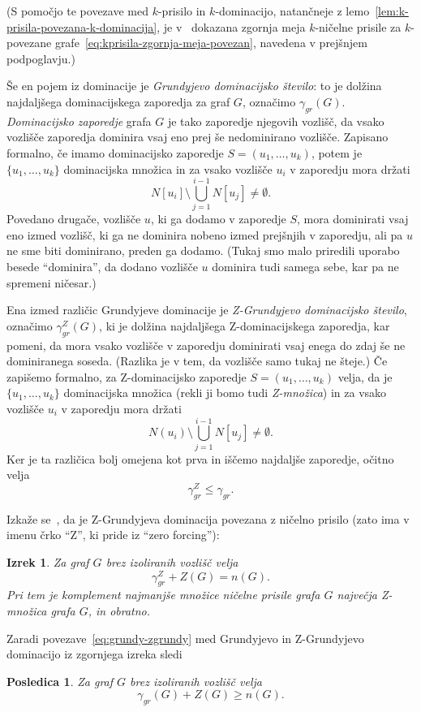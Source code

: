 \documentclass[12pt,a4paper,twoside]{article}
\theoremstyle{definition} %
\theoremstyle{plain} %
\newtheorem{izrek}[definicija]{Izrek}
\newtheorem{posledica}[definicija]{Posledica}
\numberwithin{equation}{section}  %
\begin{document}
(S pomočjo te povezave med $k$-prisilo in $k$-dominacijo, natančneje z lemo~\ref{lem:k-prisila-povezana-k-dominacija}, je v~\cite{amos2015kforcing} dokazana zgornja meja $k$-ničelne prisile za $k$-povezane grafe~\eqref{eq:kprisila-zgornja-meja-povezan}, navedena v prejšnjem podpoglavju.)

Še en pojem iz dominacije je \emph{Grundyjevo dominacijsko število}: to je dolžina najdaljšega dominacijskega zaporedja  za graf $G$, označimo $\gamma_{gr} (G)$. \emph{Dominacijsko zaporedje} grafa $G$ je tako zaporedje njegovih vozlišč, da vsako vozlišče zaporedja dominira vsaj eno prej še nedominirano vozlišče.
Zapisano formalno, če imamo dominacijsko zaporedje $S=(u_1,\ldots,u_k)$, potem je $\{u_1, \ldots, u_k\}$ dominacijska množica in za vsako vozlišče $u_i$ v zaporedju mora držati
\[ N[u_i] \setminus \bigcup_{j=1}^{i-1} N[u_j] \neq \emptyset. \]
Povedano drugače, vozlišče $u$, ki ga dodamo v zaporedje $S$, mora dominirati vsaj eno izmed vozlišč, ki ga ne dominira nobeno izmed prejšnjih v zaporedju, ali pa $u$ ne sme biti dominirano, preden ga dodamo. (Tukaj smo malo priredili uporabo besede ``dominira'', da dodano vozlišče $u$ dominira tudi samega sebe, kar pa ne spremeni ničesar.)

Ena izmed različic Grundyjeve dominacije je \emph{Z-Grundyjevo dominacijsko število}, označimo $\gamma^Z_{gr}(G)$, ki je dolžina najdaljšega Z-dominacijskega zaporedja, kar pomeni, da mora vsako vozlišče v zaporedju dominirati vsaj enega do zdaj še ne dominiranega soseda. (Razlika je v tem, da vozlišče samo tukaj ne šteje.) Če zapišemo formalno, za Z-dominacijsko zaporedje $S=(u_1,\ldots,u_k)$ velja, da je $\{u_1, \ldots, u_k\}$ dominacijska množica  (rekli ji bomo tudi \emph{Z-množica}) in za vsako vozlišče $u_i$ v zaporedju mora držati
\[ N(u_i) \setminus \bigcup_{j=1}^{i-1} N[u_j] \neq \emptyset. \]
Ker je ta različica bolj omejena kot prva in iščemo najdaljše zaporedje, očitno velja
\begin{equation}
\label{eq:grundy-zgrundy}
\gamma_{gr}^Z \leq \gamma_{gr}.
\end{equation}

Izkaže se~\cite{bresar2017grundy}, da je Z-Grundyjeva dominacija povezana z ničelno prisilo (zato ima v imenu črko ``Z'', ki pride iz ``zero forcing''):
\begin{izrek}{{\cite[izrek 2.2]{bresar2017grundy}}}
    \label{izr:prisila-zgrundy}
    Za graf $G$ brez izoliranih vozlišč velja
    \[ \gamma^Z_{gr} + Z(G) = n(G) .\]
    Pri tem je komplement najmanjše množice ničelne prisile grafa $G$ največja Z-množica grafa $G$, in obratno.
\end{izrek}
Zaradi povezave~\eqref{eq:grundy-zgrundy} med Grundyjevo in Z-Grundyjevo dominacijo iz zgornjega izreka sledi
\begin{posledica}
    Za graf $G$ brez izoliranih vozlišč velja
    \[ \gamma_{gr}(G) + Z(G) \geq n(G). \]
\end{posledica}
\end{document}
